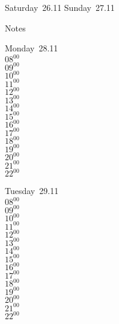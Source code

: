 \documentclass[11pt,a4paper]{book}\usepackage[]{graphicx}\usepackage[]{color}
\begin{document}
\begin{weekendbox}
  Saturday~26.11
  \tcblower
  Sunday~27.11
\end{weekendbox} %
\begin{notebox}
  Notes
\end{notebox}
\clearpage
\begin{headerbox}
\end{headerbox}
\begin{weekdaybox}
  Monday~28.11\\
  { 
  \vfill
  $08^{00}$\\
$09^{00}$\\
$10^{00}$\\
$11^{00}$\\
$12^{00}$\\
$13^{00}$\\
$14^{00}$\\
$15^{00}$\\
$16^{00}$\\
$17^{00}$\\
$18^{00}$\\
$19^{00}$\\
$20^{00}$\\
$21^{00}$\\
$22^{00}$\\
  }
\end{weekdaybox}
\begin{weekdaybox}
  Tuesday~29.11\\
  { 
  \vfill
  $08^{00}$\\
$09^{00}$\\
$10^{00}$\\
$11^{00}$\\
$12^{00}$\\
$13^{00}$\\
$14^{00}$\\
$15^{00}$\\
$16^{00}$\\
$17^{00}$\\
$18^{00}$\\
$19^{00}$\\
$20^{00}$\\
$21^{00}$\\
$22^{00}$\\
  }
\end{weekdaybox}
\end{document}
